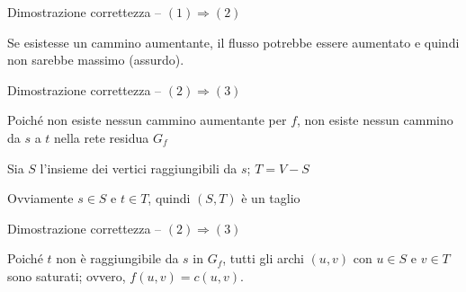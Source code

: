 \begin{frame}{Dimostrazione correttezza -- $(1) \Rightarrow (2)$}


\BIL
\item Se esistesse un cammino aumentante, il flusso potrebbe essere aumentato e quindi non sarebbe massimo (assurdo).
\EIL

\end{frame}

\begin{frame}{Dimostrazione correttezza -- $(2) \Rightarrow (3)$}

\vspace{-9pt}


\begin{center}
\end{center}

\small
\BI
\item Poiché non esiste nessun cammino aumentante per $f$, non esiste nessun cammino
da $s$ a $t$ nella rete residua $G_f$
\item Sia $S$ l'insieme dei vertici raggiungibili da $s$; $T=V-S$
\item Ovviamente $s \in S$ e $t \in T$, quindi $(S,T)$ è un taglio
\EI

\end{frame}


\begin{frame}{Dimostrazione correttezza -- $(2) \Rightarrow (3)$}

\vspace{-9pt}

\begin{center}
\end{center}

\small
\BI
\item Poiché $t$ non è raggiungibile da $s$ in $G_f$, tutti gli
archi $(u,v)$ con $u \in S$ e $v \in T$ sono saturati;  ovvero, $f(u,v) = c(u,v)$. 
\EI

\end{frame}

